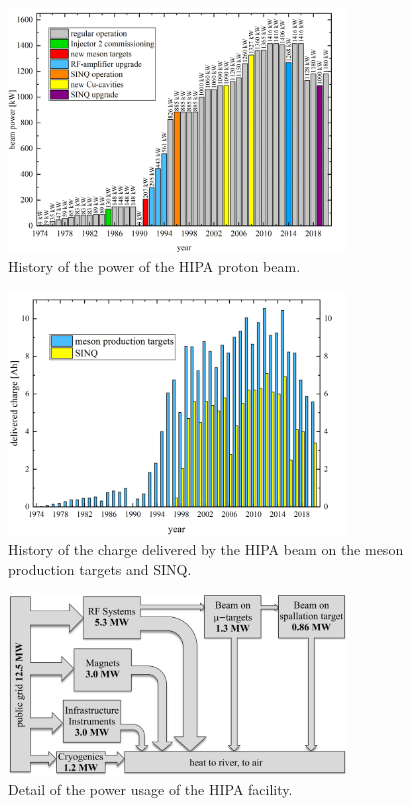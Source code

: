 \begin{refsection}
        \begin{figure}
            \centering
            \includegraphics[width = 0.8\textwidth]{Figures/Introduction/PSI_HIPA_power.png}
            \caption[HIPA: power history]{History of the power of the HIPA proton beam.}
            \label{fig:PSI:HIPA:power}
        \end{figure}
        \begin{figure}
            \centering
            \includegraphics[width = 0.8\textwidth]{Figures/Introduction/PSI_HIPA_charge.png}
            \caption[HIPA: charge history]{History of the charge delivered by the HIPA beam on the meson production targets and SINQ.}
            \label{fig:PSI:HIPA:charge}
        \end{figure}
        \begin{figure}
            \centering
            \includegraphics[width = 0.8\textwidth]{Figures/Introduction/PSI_HIPA_consumption.png}
            \caption[HIPA: power usage]{Detail of the power usage of the HIPA facility.}
            \label{fig:PSI:HIPA:consumption}
        \end{figure}
        

\end{refsection}
